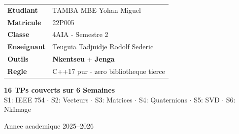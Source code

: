 \documentclass[12pt,a4paper]{report}
\newcommand{\NKE}{\textbf{\textcolor{PrimaryBlue}{Nkentseu}}}
\newcommand{\JGA}{\textbf{\textcolor{PrimaryBlue}{Jenga}}}
\begin{document}
\begin{titlepage}
\begin{center}
\begin{tcolorbox}[
  width=0.80\linewidth,
  colback=LightBlue, colframe=PrimaryBlue,
  arc=8pt, boxrule=1.2pt,
  left=14pt, right=14pt, top=10pt, bottom=10pt
]
\renewcommand{\arraystretch}{1.5}
\begin{tabular}{@{}ll@{}}
  \textcolor{PrimaryBlue}{\bfseries Etudiant}   & TAMBA MBE Yohan Miguel \\
  \textcolor{PrimaryBlue}{\bfseries Matricule}  & 22P005 \\
  \textcolor{PrimaryBlue}{\bfseries Classe}     & 4AIA - Semestre 2 \\
  \textcolor{PrimaryBlue}{\bfseries Enseignant} & Teuguia Tadjuidje Rodolf Sederic \\
  \textcolor{PrimaryBlue}{\bfseries Outils}     & \NKE{} + \JGA{} \\
  \textcolor{PrimaryBlue}{\bfseries Regle}      & C++17 pur - zero bibliotheque tierce \\
\end{tabular}
\end{tcolorbox}
\end{center}

\vfill

\begin{center}
\begin{tcolorbox}[
  width=0.75\linewidth,
  colback=LightGreen, colframe=green!50!black,
  arc=6pt, boxrule=1pt
]
\centering
{\bfseries\large\color{green!40!black}
  16 TPs couverts sur 6 Semaines}\\[4pt]
{\small\color{DarkGray}
  S1: IEEE 754 $\cdot$ S2: Vecteurs $\cdot$ S3: Matrices $\cdot$
  S4: Quaternions $\cdot$ S5: SVD $\cdot$ S6: NkImage}
\end{tcolorbox}
\end{center}

\vspace{0.5cm}
\begin{center}
  {\color{GrayText}\small Annee academique 2025--2026}
\end{center}

\end{titlepage}

\tableofcontents
\clearpage

\end{document}
